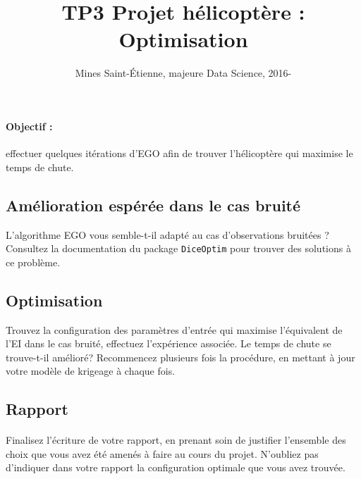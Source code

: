 \documentclass[a4paper,10pt]{article}
\title{\vspace{-1cm} TP3 Projet hélicoptère : Optimisation}
\author{Mines Saint-\'Etienne, majeure Data Science,  2016\:-\:2017 }
\date{}
\begin{document}
\maketitle
\paragraph{Objectif :} effectuer quelques itérations d'EGO afin de trouver l'hélicoptère qui maximise le temps de chute.

\subsection*{Amélioration espérée dans le cas bruité}
L'algorithme EGO vous semble-t-il adapté au cas d'observations bruitées ? Consultez la documentation du package \texttt{DiceOptim} pour trouver des solutions à ce problème. 

\subsection*{Optimisation}
Trouvez la configuration des paramètres d'entrée qui maximise l'équivalent de l'EI dans le cas bruité, effectuez l'expérience associée. Le temps de chute se trouve-t-il amélioré? Recommencez plusieurs fois la procédure, en mettant à jour votre modèle de krigeage à chaque fois. 

\subsection*{Rapport}
\paragraph{}
Finalisez l'écriture de votre rapport, en prenant soin de justifier l'ensemble des choix que vous avez été amenés à faire au cours du projet. N'oubliez pas d'indiquer dans votre rapport la configuration optimale que vous avez trouvée.
\end{document}
